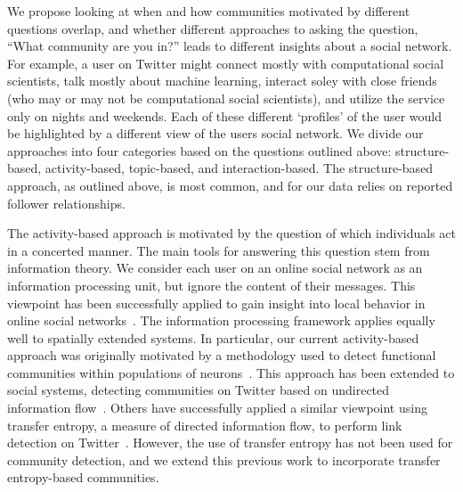 \documentclass[letterpaper]{article}
\begin{document}
We propose looking at when and how communities motivated by different questions overlap, and whether different approaches to asking the question, ``What community are you in?'' leads to different insights about a social network. For example, a user on Twitter might connect mostly with computational social scientists, talk mostly about machine learning, interact soley with close friends (who may or may not be computational social scientists), and utilize the service only on nights and weekends. Each of these different `profiles' of the user would be highlighted by a different view of the users social network. We divide our approaches into four categories based on the questions outlined above: structure-based, activity-based, topic-based, and interaction-based. The structure-based approach, as outlined above, is most common, and for our data relies on reported follower relationships.

The activity-based approach is motivated by the question of which individuals act in a concerted manner. The main tools for answering this question stem from information theory. We consider each user on an online social network as an information processing unit, but ignore the content of their messages. This viewpoint has been successfully applied to gain insight into local behavior in online social networks~\cite{darmon2013understanding}. The information processing framework applies equally well to spatially extended systems. In particular, our current activity-based approach was originally motivated by a methodology used to detect functional communities within populations of neurons~\cite{shalizi2007discovering}. This approach has been extended to social systems, detecting communities on Twitter based on undirected information flow~\cite{darmon2013detecting}. Others have successfully applied a similar viewpoint using transfer entropy, a measure of directed information flow, to perform link detection on Twitter~\cite{ver2012information}. However, the use of transfer entropy has not been used for community detection, and we extend this previous work to incorporate transfer entropy-based communities.
\end{document}
